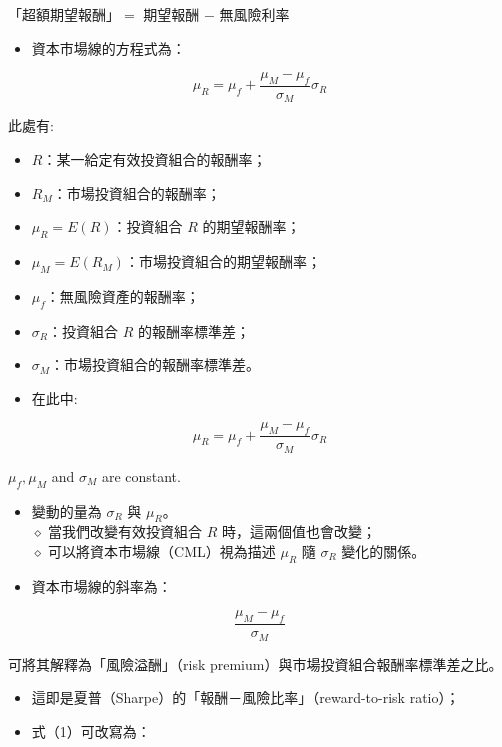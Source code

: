 \documentclass[letterpaper]{article}
\begin{document}
「超額期望報酬」$=$ 期望報酬 $-$ 無風險利率

\begin{itemize}
	\item 資本市場線的方程式為：
\end{itemize}



\begin{equation*}
\mu_{R}=\mu_{f}+\frac{\mu_{M}-\mu_{f}}{\sigma_{M}} \sigma_{R} \tag{1}
\end{equation*}


此處有:

\begin{itemize}
	\item $R$：某一給定有效投資組合的報酬率；
	\item $R_{M}$：市場投資組合的報酬率；
	\item $\mu_{R} = E(R)$：投資組合 $R$ 的期望報酬率；
	\item $\mu_{M} = E(R_{M})$：市場投資組合的期望報酬率；
	\item $\mu_{f}$：無風險資產的報酬率；
	\item $\sigma_{R}$：投資組合 $R$ 的報酬率標準差；
	\item $\sigma_{M}$：市場投資組合的報酬率標準差。
\end{itemize}


\begin{itemize}
  \item 在此中:
\end{itemize}

$$
\mu_{R}=\mu_{f}+\frac{\mu_{M}-\mu_{f}}{\sigma_{M}} \sigma_{R}
$$

$\mu_{f}, \mu_{M}$ and $\sigma_{M}$ are constant.

\begin{itemize}
	\item 變動的量為 $\sigma_{R}$ 與 $\mu_{R}$。\\
	$\diamond$ 當我們改變有效投資組合 $R$ 時，這兩個值也會改變；\\
	$\diamond$ 可以將資本市場線（CML）視為描述 $\mu_{R}$ 隨 $\sigma_{R}$ 變化的關係。
	\item 資本市場線的斜率為：
\end{itemize}


$$
\frac{\mu_{M}-\mu_{f}}{\sigma_{M}}
$$

可將其解釋為「風險溢酬」（risk premium）與市場投資組合報酬率標準差之比。

\begin{itemize}
	\item 這即是夏普（Sharpe）的「報酬－風險比率」（reward-to-risk ratio）；
	\item 式（1）可改寫為：
\end{itemize}
\end{document}
